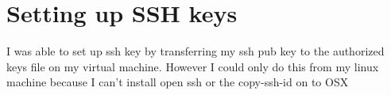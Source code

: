 \documentclass{article}
\begin{document}
\section{Setting up SSH keys}
I was able to set up ssh key by transferring my ssh pub key to the authorized keys file on my virtual machine. However I could only do this from my linux machine because I can't install open ssh or the copy-ssh-id on to OSX
\end{document}
